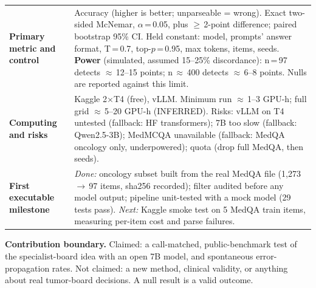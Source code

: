 \documentclass[11pt]{article}
\begin{document}
\begin{tabularx}{\textwidth}{@{}>{\raggedright\arraybackslash}p{3.1cm}L@{}}
\textbf{Primary metric and control} & Accuracy (higher is better; unparseable = wrong). Exact two-sided McNemar, $\alpha$\,=\,0.05, plus $\geq$\,2-point difference; paired bootstrap 95\% CI. Held constant: model, prompts' answer format, T\,=\,0.7, top-$p$\,=\,0.95, max tokens, items, seeds. \textbf{Power} (simulated, assumed 15--25\% discordance): n\,=\,97 detects $\approx$\,12--15 points; n\,$\approx$\,400 detects $\approx$\,6--8 points. Nulls are reported against this limit. \\
\textbf{Computing and risks} & Kaggle 2$\times$T4 (free), vLLM. Minimum run $\approx$\,1--3 GPU-h; full grid $\approx$\,5--20 GPU-h (INFERRED). Risks: vLLM on T4 untested (fallback: HF transformers); 7B too slow (fallback: Qwen2.5-3B); MedMCQA unavailable (fallback: MedQA oncology only, underpowered); quota (drop full MedQA, then seeds). \\
\textbf{First executable milestone} & \emph{Done:} oncology subset built from the real MedQA file (1,273\,$\rightarrow$\,97 items, sha256 recorded); filter audited before any model output; pipeline unit-tested with a mock model (29 tests pass). \emph{Next:} Kaggle smoke test on 5 MedQA train items, measuring per-item cost and parse failures. \\
\bottomrule
\end{tabularx}

\vspace{6pt}
\textbf{Contribution boundary.} Claimed: a call-matched, public-benchmark test of the specialist-board idea with an open 7B model, and spontaneous error-propagation rates. Not claimed: a new method, clinical validity, or anything about real tumor-board decisions. A null result is a valid outcome.
\end{document}
